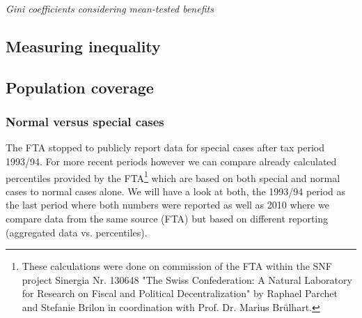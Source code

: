 \documentclass[twoside]{article}\usepackage[]{graphicx}\usepackage[]{color}
\begin{document}
\begin{multicols}{2}
\emph{Gini coefficients considering mean-tested benefits}


\subsection{Measuring inequality}


\subsection{Population coverage}

\subsubsection{Normal versus special cases}

The FTA stopped to publicly report data for special cases after tax period 1993/94. 
For more recent periods however we can compare already calculated percentiles provided by the FTA\footnote{These calculations were done on commission of the FTA within the SNF project Sinergia Nr. 130648 "The Swiss Confederation: A Natural Laboratory for Research on Fiscal and Political Decentralization" by Raphael Parchet and Stefanie Brilon in coordination with Prof. Dr. Marius Brülhart.} which are based on both special and normal cases to normal cases alone.
We will have a look at both, the 1993/94 period as the last period where both 
numbers were reported as well as 2010 where we compare data from the same source (FTA)
but based on different reporting (aggregated data vs. percentiles).


\end{multicols}
\end{document}
